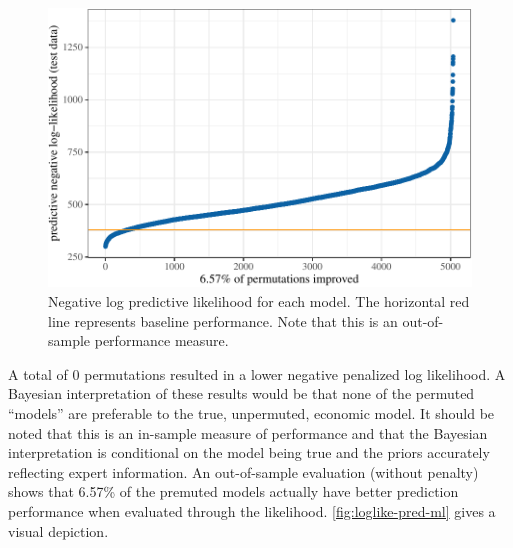 \documentclass[11pt]{article}
\begin{document}
\begin{figure}[t]

{\centering \includegraphics{gfx/loglike-pred-ml-1} 

}

\caption{Negative log predictive likelihood for each model. The horizontal red line represents baseline performance. Note that this is an out-of-sample performance measure.}\label{fig:loglike-pred-ml}
\end{figure}

A total of 0 permutations resulted in a lower negative penalized log
likelihood. A Bayesian interpretation of these results would be that
none of the permuted ``models'' are preferable to the true, unpermuted,
economic model. It should be noted that this is an in-sample measure of
performance and that the Bayesian interpretation is conditional on the
model being true and the priors accurately reflecting expert
information. An out-of-sample evaluation (without penalty) shows that
6.57\% of the premuted models actually have better prediction
performance when evaluated through the likelihood.
\autoref{fig:loglike-pred-ml} gives a visual depiction.

\begin{table}

\caption{\label{tab:best-results}Series MSEs for SW and top models.}
\centering
{}
\end{table}
\end{document}
